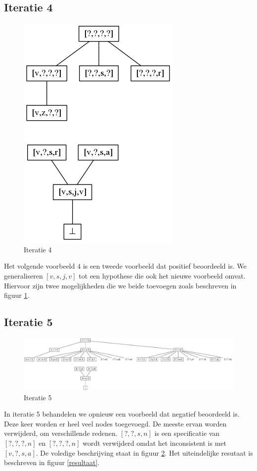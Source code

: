 \documentclass[alternative-exam.tex]{subfiles}
\begin{document}
\subsection{Iteratie 4}
\begin{figure}
[H]
\centering
\caption{Iteratie 4}
\label{iter_4}
\includegraphics[scale=0.5]{resources/graphs/iteration_4.png}
\end{figure}
Het volgende voorbeeld $4$ is een tweede voorbeeld dat positief beoordeeld is. We generaliseren $[v,s,j,v]$ tot een hypothese die ook het nieuwe voorbeeld omvat. Hiervoor zijn twee mogelijkheden die we beide toevoegen zoals beschreven in figuur \ref{iter_4}.

\subsection{Iteratie 5}
\begin{figure}
\centering
\caption{Iteratie 5}
\label{iter_5}
\includegraphics[scale=0.35]{resources/graphs/iteration_5.png}
\end{figure}
In iteratie 5 behandelen we opnieuw een voorbeeld dat negatief beoordeeld is. Deze keer worden er heel veel nodes toegevoegd. De meeste ervan worden verwijderd, om verschillende redenen. $[?,?,s,n]$ is een specificatie van $[?,?,?,n]$ en $[?,?,?,n]$ wordt verwijderd omdat het inconsistent is met $[v,?,s,a]$. De voledige beschrijving staat in figuur \ref{iter_5}. Het uiteindelijke resutaat is beschreven in figuur \ref{resultaat}.
\end{document}
